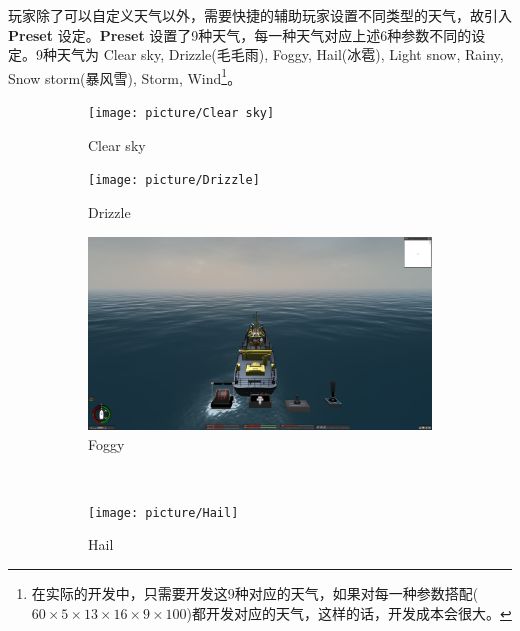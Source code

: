 \documentclass[letterpaper,10pt]{article}
\begin{document}
				玩家除了可以自定义天气以外，需要快捷的辅助玩家设置不同类型的天气，故引入 \textbf{Preset} 设定。\textbf{Preset} 设置了9种天气，每一种天气对应上述6种参数不同的设定。9种天气为 Clear sky, Drizzle(毛毛雨), Foggy, Hail(冰雹), Light snow, Rainy, Snow storm(暴风雪), Storm, Wind\footnote{在实际的开发中，只需要开发这9种对应的天气，如果对每一种参数搭配($60 \times 5 \times 13 \times 16 \times 9 \times 100$)都开发对应的天气，这样的话，开发成本会很大。}。
				
				\begin{figure}[htbp] 
					\centering 
					
					\begin{subfigure}{0.3\textwidth}
						\texttt{[image: picture/Clear sky]}
						\captionsetup{font=scriptsize}
						\caption{Clear sky}
						\label{fig: Clear sky}
					\end{subfigure}
					\begin{subfigure}{0.3\textwidth}
						\texttt{[image: picture/Drizzle]}
						\captionsetup{font=scriptsize}
						\caption{Drizzle}
						\label{fig: Drizzle}
					\end{subfigure}
					\begin{subfigure}{0.3\textwidth}
						\includegraphics[width=\linewidth]{picture/Foggy}
						\captionsetup{font=scriptsize}
						\caption{Foggy}
						\label{fig: Foggy}	
					\end{subfigure}\\
					\begin{subfigure}{0.3\textwidth}
						\texttt{[image: picture/Hail]}
						\captionsetup{font=scriptsize}
						\caption{Hail}
						\label{fig: Hail}	
					\end{subfigure}
					\begin{subfigure}{0.3\textwidth}

\end{subfigure}
\end{figure}
\end{document}
